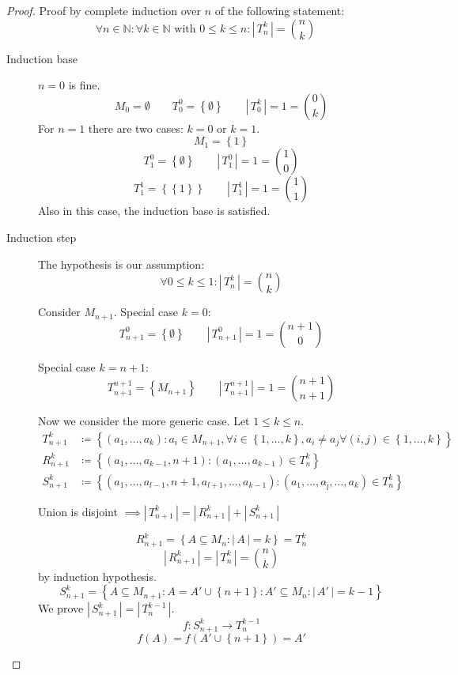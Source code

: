 \documentclass[a4paper,landscape,twocolumn]{article}
\theoremstyle{definition}
\newcommand\set[1]{\left\{#1\right\}}
\newcommand\card[1]{\left|\,#1\,\right|}
\begin{document}
\begin{proof}
  Proof by complete induction over $n$ of the following statement:
  \[
    \forall n \in \mathbb{N}: \forall k \in \mathbb{N} \text{ with } 0 \leq k \leq n:
    \card{T_n^k} = \binom{n}{k}
  \]
  \begin{description}
    \item[Induction base]
      $n = 0$ is fine.
      \[
        M_0 = \emptyset \qquad
        T_0^0 = \set{\emptyset} \qquad
        \card{T_0^k} = 1 = \binom{0}{k}
      \]
      For $n = 1$ there are two cases: $k = 0$ or $k = 1$.
      \[ M_1 = \set{1} \]
      \[ T_1^0 = \set{\emptyset} \qquad \card{T_1^0} = 1 = \binom{1}{0} \]
      \[ T_1^1 = \set{\set{1}} \qquad \card{T_1^1} = 1 = \binom{1}{1} \]
      Also in this case, the induction base is satisfied.
    \item[Induction step]
      The hypothesis is our assumption:
      \[ \forall 0 \leq k \leq 1: \card{T_n^k} = \binom{n}{k} \]

      Consider $M_{n+1}$. Special case $k = 0$:
      \[ T_{n+1}^0 = \set{\emptyset} \qquad \card{T_{n+1}^0} = 1 = \binom{n+1}{0} \]

      Special case $k = n + 1$:
      \[ T_{n+1}^{n+1} = \set{M_{n+1}} \qquad \card{T_{n+1}^{n+1}} = 1 = \binom{n+1}{n+1} \]

      Now we consider the more generic case. Let $1 \leq k \leq n$.
      \begin{align*}
        T_{n+1}^k &\coloneqq \set{(a_1, \ldots, a_k) : a_i \in M_{n+1}, \forall i \in \set{1, \ldots, k}, a_i \neq a_j \forall (i,j) \in \set{1, \ldots, k}} \\
        R_{n+1}^k &\coloneqq \set{(a_1, \ldots, a_{k-1}, n+1): (a_1, \ldots, a_{k-1}) \in T_n^k} \\
        S_{n+1}^k &\coloneqq \set{(a_1, \ldots, a_{l-1}, n+1, a_{l+1}, \ldots, a_{k-1}): (a_1, \ldots, a_{\hat{l}}, \ldots, a_k) \in T_n^k}
      \end{align*}

      Union is disjoint $\implies \card{T_{n+1}^k} = \card{R_{n+1}^k} + \card{S_{n+1}^k}$

      \[ R_{n+1}^k = \set{A \subseteq M_n: \card{A} = k} = T_n^k \]
      \[ \card{R_{n+1}^k} = \card{T_n^k} = \binom{n}{k} \]
      by induction hypothesis.
      \[ S_{n+1}^k = \set{A \subseteq M_{n+1}: A = A' \cup \set{n+1}: A' \subseteq M_n: \card{A'} = k - 1} \]
      We prove $\card{S_{n+1}^k} = \card{T_n^{k-1}}$.
      \[ f: S_{n+1}^k \to T_n^{k-1} \]
      \[ f(A) = f(A' \cup \set{n+1}) = A' \]


\end{description}
\end{proof}
\end{document}

